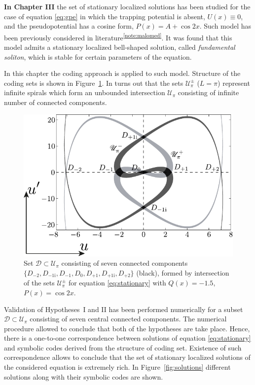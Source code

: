 \documentclass[candidate, href, colorlinks]{disser}
\begin{document}
\textbf{In Chapter III} the set of stationary localized solutions has been studied for the case of equation \eqref{eq:gpe} in which the trapping potential is absent, $U(x) \equiv 0$, and the pseudopotential has a cosine form, $P(x) = A + \cos 2x$.
Such model has been previously considered in literature\textsuperscript{\ref{note:malomed}}.
It was found that this model admits a stationary localized bell-shaped solution, called {\it fundamental soliton}, which is stable for certain parameters of the equation.

In this chapter the coding approach is applied to such model.
Structure of the coding sets is shown in Figure~\ref{fig:island-set}.
In turns out that the sets $\mathscr{U}_{\pi}^{\pm}$ ($L = \pi$) represent infinite spirals which form an unbounded intersection $\mathscr{U}_{\pi}$ consisting of infinite number of connected components.

\begin{figure}[h]
\centering
	\includegraphics[scale = 1]{../pic/island set to check hypotheses for cosine equation}
	\caption{
		Set $\mathcal{D} \subset \mathscr{U}_{\pi}$ consisting of seven connected components $\{ D_{-2}, D_{-1\mathrm{i}}, D_{-1}, D_0, D_{+1}, D_{+1\mathrm{i}}, D_{+2} \}$ (black), formed by intersection of the sets $\mathscr{U}_{\pi}^{\pm}$ for equation \eqref{eq:stationary} with $Q(x) = -1.5$, $P(x) = \cos 2x$.
	}
\label{fig:island-set}
\end{figure}

Validation of Hypotheses~I and II has been performed numerically for a subset $\mathcal{D} \subset \mathscr{U}_{\pi}$ consisting of seven central connected components.
The numerical procedure allowed to conclude that both of the hypotheses are take place.
Hence, there is a one-to-one correspondence between solutions of equation \eqref{eq:stationary} and symbolic codes derived from the structure of coding set.
Existence of such correspondence allows to conclude that the set of stationary localized solutions of the considered equation is extremely rich.
In Figure~\ref{fig:solutions} different solutions along with their symbolic codes are shown.
\end{document}
